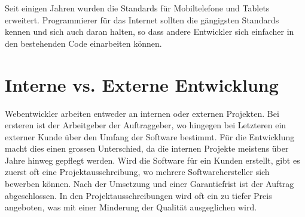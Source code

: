 Seit einigen Jahren wurden die Standards für Mobiltelefone und Tablets erweitert. Programmierer für das Internet sollten die gängigsten Standards kennen und sich auch daran halten, so dass andere Entwickler sich einfacher in den bestehenden Code einarbeiten können.

\section{Interne vs. Externe Entwicklung}
Webentwickler arbeiten entweder an internen oder externen Projekten. Bei ersteren ist der Arbeitgeber der Auftraggeber, wo hingegen bei Letzteren ein externer Kunde über den Umfang der Software bestimmt. Für die Entwicklung macht dies einen grossen Unterschied, da die internen Projekte meistens über Jahre hinweg gepflegt werden. Wird die Software für ein Kunden erstellt, gibt es zuerst oft eine Projektausschreibung, wo mehrere Softwarehersteller sich bewerben können. Nach der Umsetzung und einer Garantiefrist ist der Auftrag abgeschlossen. In den Projektausschreibungen wird oft ein zu tiefer Preis angeboten, was mit einer Minderung der Qualität ausgeglichen wird.